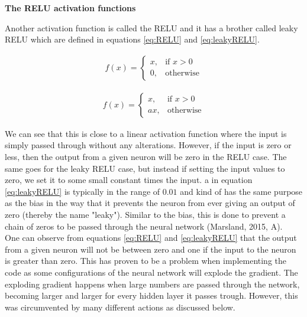 \documentclass[12pt,a4paper]{article}
\begin{document}
\begin{center}
\large{\textbf{The RELU activation functions}}
\end{center}

\noindent Another activation function is called the RELU and it has a brother called leaky RELU which are defined in equations \ref{eq:RELU} and \ref{eq:leakyRELU}.

\begin{equation}\label{eq:RELU}
\begin{aligned}
f(x) = 
\begin{cases}
x,& \text{if } x > 0\\
0,& \text{otherwise}
\end{cases}
\end{aligned}
\end{equation}

\begin{equation}\label{eq:leakyRELU}
\begin{aligned}
f(x) = 
\begin{cases}
x,& \text{if } x > 0\\
ax,& \text{otherwise}
\end{cases}
\end{aligned}
\end{equation}

\noindent We can see that this is close to a linear activation function where the input is simply passed through without any alterations. However, if the input is zero or less, then the output from a given neuron will be zero in the RELU case. The same goes for the leaky RELU case, but instead if setting the input values to zero, we set it to some small constant times the input. a in equation \ref{eq:leakyRELU} is typically in the range of $0.01$ and kind of has the same purpose as the bias in the way that it prevents the neuron from ever giving an output of zero (thereby the name "leaky"). Similar to the bias, this is done to prevent a chain of zeros to be passed through the neural network (Marsland, 2015, A).
\\
One can observe from equations \ref{eq:RELU} and \ref{eq:leakyRELU} that the output from a given neuron will not be between zero and one if the input to the neuron is greater than zero. This has proven to be a problem when implementing the code as some configurations of the neural network will explode the gradient. The exploding gradient happens when large numbers are passed through the network, becoming larger and larger for every hidden layer it passes trough. However, this was circumvented by many different actions as discussed below. 
\end{document}
